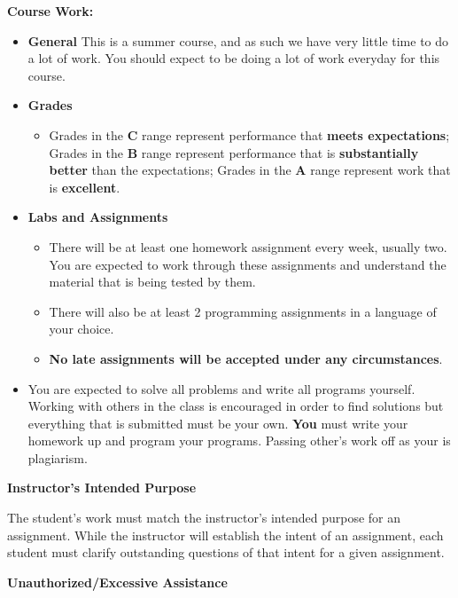 \documentclass[11pt]{article}
\begin{document}
\textbf {\large Course Work:}
\begin{itemize}
	\item \textbf {General}
          This is a summer course, and as such we have very little time to do a lot of work. You should expect to be doing a lot of work everyday for this course.
	\item \textbf {Grades}
		\begin{itemize}
			\item Grades in the \textbf{C} range represent performance that \textbf{meets expectations}; Grades in the \textbf{B} range represent performance that is \textbf{substantially better} than the expectations; Grades in the \textbf{A} range represent work that is \textbf{excellent}.
		\end{itemize}
	\item \textbf {Labs and Assignments}
		\begin{itemize}
                  \item There will be at least one homework assignment every week, usually two. You are expected to work through these assignments and understand the material that is being tested by them.
                  \item There will also be at least 2 programming assignments in a language of your choice.
                  \item \textbf{No late assignments will be accepted under any circumstances}.
		\end{itemize}
        \item You are expected to solve all problems and write all programs yourself. Working with others in the class is encouraged in order to find solutions
          but everything that is submitted must be your own. \textbf{You} must write your homework up and program your programs. Passing other's work off as your
          is plagiarism.
\end{itemize}


\textbf{Instructor's Intended Purpose}

\hspace{3mm}
\hangindent=5mm The student's work must match the instructor's intended purpose for an assignment. While the instructor will establish the intent of an assignment, each student must clarify outstanding questions of that intent for a given assignment. 

\textbf{Unauthorized/Excessive Assistance}
\end{document}
